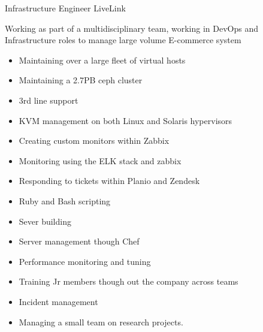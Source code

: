 \documentclass[]{friggeri-cv-a4}
\begin{document}
\begin{entrylist}
  	{Infrastructure Engineer}
  	{LiveLink}
  	{
      Working as part of a multidisciplinary team, working in DevOps and Infrastructure roles to manage large volume E-commerce system
    \begin{itemize}
      \item Maintaining over a large fleet of virtual hosts
      \item Maintaining a 2.7PB ceph cluster
      \item 3rd line support
      \item KVM management on both Linux and Solaris hypervisors
      \item Creating custom monitors within Zabbix
      \item Monitoring using the ELK stack and zabbix
      \item Responding to tickets within Planio and Zendesk
      \item Ruby and Bash scripting
      \item Sever building
      \item Server management though Chef
      \item Performance monitoring and tuning
      \item Training Jr members though out the company across teams
      \item Incident management
      \item Managing a small team on research projects.
    \end{itemize}
    }
 \end{entrylist}
\end{document}
